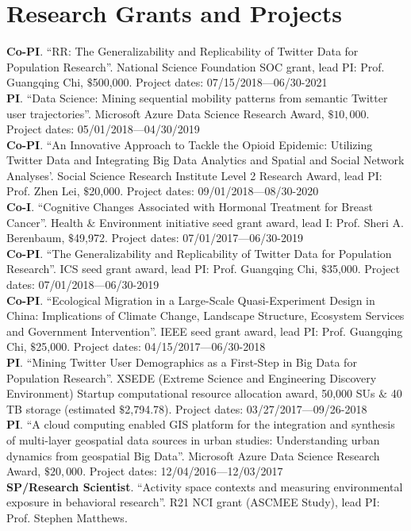 \documentclass[11pt, a4paper]{article}
\begin{document}
\section*{Research Grants and Projects}
\textbf{Co-PI}. ``RR: The Generalizability and Replicability of Twitter Data for Population Research''. National Science Foundation SOC grant, lead PI: Prof. Guangqing Chi, $\$$500,000. Project dates: 07/15/2018—06/30-2021\\
\textbf{PI}. ``Data Science: Mining sequential mobility patterns from semantic Twitter user trajectories''. Microsoft Azure Data Science Research Award, $\$10,000$. Project dates: 05/01/2018—04/30/2019\\
\textbf{Co-PI}. ``An Innovative Approach to Tackle the Opioid Epidemic: Utilizing Twitter Data and Integrating Big Data Analytics and Spatial and Social Network Analyses'. Social Science Research Institute Level 2 Research Award, lead PI: Prof. Zhen Lei, $\$$20,000. Project dates: 09/01/2018—08/30-2020\\
\textbf{Co-I}. ``Cognitive Changes Associated with Hormonal Treatment for Breast Cancer''. Health $\&$ Environment initiative seed grant award, lead I: Prof. Sheri A. Berenbaum, $\$$49,972. Project dates: 07/01/2017—06/30-2019\\
\textbf{Co-PI}. ``The Generalizability and Replicability of Twitter Data for Population Research''. ICS seed grant award, lead PI: Prof. Guangqing Chi, $\$$35,000. Project dates: 07/01/2018—06/30-2019\\
\textbf{Co-PI}. ``Ecological Migration in a Large-Scale Quasi-Experiment Design in China: Implications of Climate Change, Landscape Structure, Ecosystem Services and Government Intervention''. IEEE seed grant award, lead PI: Prof. Guangqing Chi, $\$$25,000. Project dates: 04/15/2017—06/30-2018\\
\textbf{PI}. ``Mining Twitter User Demographics as a First-Step in Big Data for Population Research''. XSEDE (Extreme Science and Engineering Discovery Environment) Startup computational resource allocation award, 50,000 SUs $\&$ 40 TB storage (estimated $\$$2,794.78). Project dates: 03/27/2017—09/26-2018\\
\textbf{PI}. ``A cloud computing enabled GIS platform for the integration and synthesis of multi-layer geospatial data sources in urban studies: Understanding urban dynamics from geospatial Big Data''. Microsoft Azure Data Science Research Award, $\$20,000$. Project dates: 12/04/2016—12/03/2017\\
\textbf{SP/Research Scientist}. ``Activity space contexts and measuring environmental exposure in behavioral research''. R21 NCI grant (ASCMEE Study), lead PI: Prof. Stephen Matthews.
\end{document}
